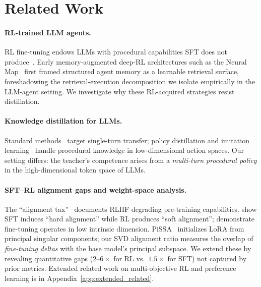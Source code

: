 \section{Related Work}
\label{sec:related}

\paragraph{RL-trained LLM agents.}
RL fine-tuning endows LLMs with procedural capabilities SFT does not produce~\cite{zhou2025mem1,zhou2024webarena,liu2024agentbench,yao2023react,zeng2024agenttuning}. Early memory-augmented deep-RL architectures such as the Neural Map~\cite{parisotto2018neuralmap} first framed structured agent memory as a learnable retrieval surface, foreshadowing the retrieval-execution decomposition we isolate empirically in the LLM-agent setting. We investigate why these RL-acquired strategies resist distillation.

\paragraph{Knowledge distillation for LLMs.}
Standard methods~\cite{hsieh2023distilling,gu2024minillm,jiang2023lion} target single-turn transfer; policy distillation and imitation learning~\cite{rusu2016policy,czarnecki2019distilling,ross2011dagger} handle procedural knowledge in low-dimensional action spaces. Our setting differs: the teacher's competence arises from a \emph{multi-turn procedural policy} in the high-dimensional token space of LLMs.

\paragraph{SFT--RL alignment gaps and weight-space analysis.}
The ``alignment tax''~\cite{askell2021alignment} documents RLHF degrading pre-training capabilities. \citet{jin2025rl} show SFT induces ``hard alignment'' while RL produces ``soft alignment''; \citet{aghajanyan2021intrinsic} demonstrate fine-tuning operates in low intrinsic dimension. PiSSA~\cite{meng2024pissa} initializes LoRA from principal singular components; our SVD alignment ratio measures the overlap of \emph{fine-tuning deltas} with the base model's principal subspace. We extend these by revealing quantitative gaps ($2$--$6\times$ for RL vs.\ $1.5\times$ for SFT) not captured by prior metrics. Extended related work on multi-objective RL and preference learning is in Appendix~\ref{app:extended_related}.

